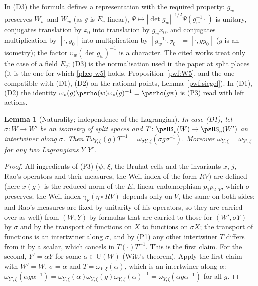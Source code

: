 \documentclass[10pt]{amsart}
\newtheorem{lemma}[theorem]{Lemma}
\theoremstyle{definition}
\theoremstyle{remark}
\providecommand{\auU}{\mathrm U}
\providecommand{\aubar}[1]{\overline{#1}}
\begin{document}
In (D3) the formula defines a representation with the required property: $g_w$ preserves $W_w$
and $W_{\aubar w}$ (as $g$ is $E_v$-linear), $\Psi\mapsto|\det g_w|^{-1/2}\Psi(g_w^{-1}\cdot)$ is
unitary, conjugates translation by $x_0$ into translation by $g_wx_0$, and conjugates multiplication
by $[\cdot,y_0]$ into multiplication by $[g_w^{-1}\cdot,y_0]=[\cdot,gy_0]$ ($g$ is an isometry);
the factor $\upsilon_w(\det g_w)^{-1}$ is a character. The cited works treat only the case of a
field $E_v$; (D3) is the normalisation used in the paper at split places (it is the one for which
\eqref{pl:eq-w5} holds, Proposition~\ref{pwf:W5}, and the one compatible with (D1), (D2) on the
rational points, Lemma~\ref{pwf:siegel}). In (D1), (D2) the identity $\omega_v(g)\psrho(w)
\omega_v(g)^{-1}=\psrho(gw)$ is (P3) read with left actions.

\begin{lemma}[Naturality; independence of the Lagrangian]\label{pwf:indep}
In case (D1), let $\sigma\colon W\to W'$ be an isometry of split spaces and $T\colon\psHS_v(W)\to
\psHS_v(W')$ an intertwiner along $\sigma$. Then $T\omega_{Y,\xi}(g)T^{-1}=\omega_{\sigma Y,\xi}
(\sigma g\sigma^{-1})$. Moreover $\omega_{Y,\xi}=\omega_{Y',\xi}$ for any two Lagrangians $Y,Y'$.
\end{lemma}
\begin{proof}
All ingredients of (P3) ($\psi$, $\xi$, the Bruhat cells and the invariants $x$, $j$, Rao's
operators and their measures, the Weil index of the form $RV$) are defined
(here $x(g)$ is the reduced norm of the $E_v$-linear endomorphism $p_1p_2|_Y$, which $\sigma$
preserves; the Weil index $\gamma_F(\eta\circ RV)$ depends only on $V$, the same on both sides; and
Rao's measures are fixed by unitarity of his operators, so they are carried over as well) from $(W,Y)$ by
formulas that are carried to those for $(W',\sigma Y)$ by $\sigma$ and by the transport of functions
on $X$ to functions on $\sigma X$; the transport of functions is an intertwiner along $\sigma$, and
by (P1) any other intertwiner $T$ differs from it by a scalar, which cancels in $T(\cdot)T^{-1}$.
This is the first claim. For the second, $Y'=\alpha Y$ for some $\alpha\in\auU(W)$ (Witt's theorem).
Apply the first claim with $W'=W$, $\sigma=\alpha$ and $T=\omega_{Y,\xi}(\alpha)$, which is an
intertwiner along $\alpha$: $\omega_{Y',\xi}(\alpha g\alpha^{-1})=\omega_{Y,\xi}(\alpha)\omega_{Y,\xi}(g)
\omega_{Y,\xi}(\alpha)^{-1}=\omega_{Y,\xi}(\alpha g\alpha^{-1})$ for all $g$.
\end{proof}
\end{document}
